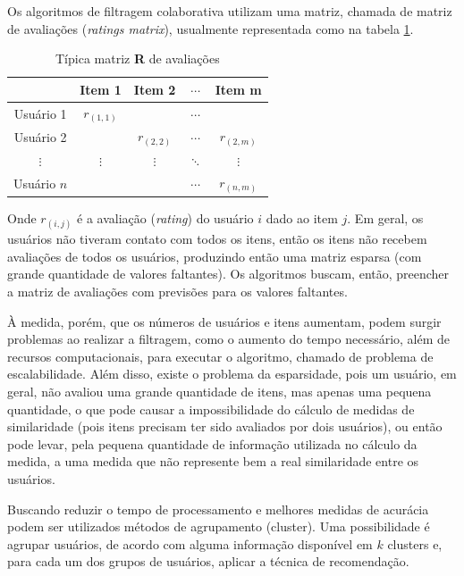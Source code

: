 \documentclass[12pt,a4paper,header]{abnt}
\begin{document}
Os algoritmos de filtragem colaborativa utilizam uma matriz, chamada de matriz de avaliações (\textit{ratings matrix}), usualmente representada como na tabela \ref{rating_matrix}.

\begin{table}[h]
\caption{Típica matriz \textbf{R} de avaliações}
\label{rating_matrix}
\centering
\begin{tabular}{@{}c|cccc@{}}
\cmidrule(l){2-5}
\textbf{}   & Item 1       & Item 2       & $\cdots$ & Item m       \\ \midrule
Usuário 1   & $r_{(1, 1)}$ &              & $\cdots$ &              \\
Usuário 2   &              & $r_{(2, 2)}$ & $\cdots$ & $r_{(2, m)}$ \\
$\vdots$    & $\vdots$     & $\vdots$     & $\ddots$ & $\vdots$     \\
Usuário $n$ &              &              & $\cdots$ & $r_{(n, m)}$ \\ \bottomrule
\end{tabular}
\end{table}

Onde $r_{(i, j)}$ é a avaliação (\textit{rating}) do usuário $i$ dado ao item $j$. Em geral, os usuários não tiveram contato com todos os itens, então os itens não recebem avaliações de todos os usuários, produzindo então uma matriz esparsa (com grande quantidade de valores faltantes). Os algoritmos buscam, então, preencher a matriz de avaliações com previsões para os valores faltantes.

À medida, porém, que os números de usuários e itens aumentam, podem surgir problemas ao realizar a filtragem, como o aumento do tempo necessário, além de recursos computacionais, para executar o algoritmo, chamado de problema de escalabilidade\cite{dakhel2011new}. Além disso, existe o problema da esparsidade, pois um usuário, em geral, não avaliou uma grande quantidade de itens, mas apenas uma pequena quantidade, o que pode causar a impossibilidade do cálculo de medidas de similaridade (pois itens precisam ter sido avaliados por dois usuários), ou então pode levar, pela pequena quantidade de informação utilizada no cálculo da medida, a uma medida que não represente bem a real similaridade entre os usuários\cite{dakhel2011new}.

Buscando reduzir o tempo de processamento e melhores medidas de acurácia podem ser utilizados métodos de agrupamento (cluster)\cite{o1999clustering}. Uma possibilidade é agrupar usuários, de acordo com alguma informação disponível em $k$ clusters e, para cada um dos grupos de usuários, aplicar a técnica de recomendação.  
\end{document}
